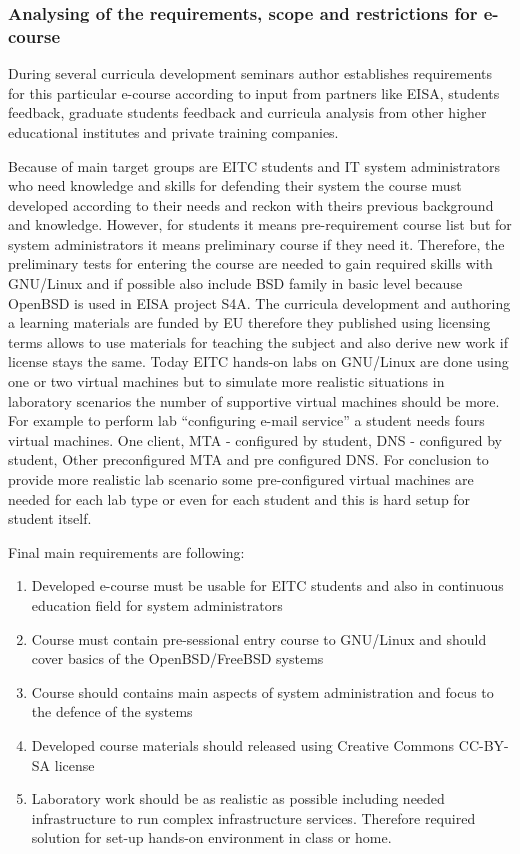 \subsubsection{Analysing of the requirements, scope and restrictions for e-course}
During several curricula development seminars author establishes requirements for this particular e-course according to input from partners like \gls{EISA}, students feedback, graduate students feedback and curricula analysis from other higher educational institutes and private training companies. 

Because of main target groups are \gls{EITC} students and IT system administrators who need knowledge and skills for defending their system the course must developed according to their needs and reckon with theirs previous background and knowledge. However, for students it means pre-requirement course list but for system administrators it means preliminary course if they need it. Therefore, the preliminary tests for entering the course are needed to gain required skills with GNU/Linux and if possible also include BSD family in basic level because OpenBSD is used in \gls{EISA} project S4A.
The curricula development and authoring a learning materials are funded by EU therefore they  published using licensing terms allows to use materials for teaching the subject and also derive new work if license stays the same.
Today EITC hands-on labs on GNU/Linux are done using one or two virtual machines but to simulate more realistic situations in laboratory scenarios the number of supportive virtual machines should be more. For example to perform lab “configuring e-mail service” a student needs fours virtual machines. One client, MTA - configured by student, DNS -  configured by student, Other preconfigured MTA and pre configured DNS. For conclusion to provide more realistic lab scenario some pre-configured virtual machines are needed for each lab type or even for each student and this is hard setup for student itself.

Final main requirements are following:
\begin{enumerate}[label=Requirement \arabic*.,leftmargin=*]
  \item Developed e-course must be usable for \gls{EITC} students and also in continuous education field for system administrators
  \item Course must contain pre-sessional entry course to GNU/Linux and should cover basics  of the OpenBSD/FreeBSD systems
  \item Course should contains main aspects of system administration and focus to the defence of the systems
  \item Developed course materials should released using Creative Commons \gls{CC-BY-SA} license
  \item Laboratory work should be as realistic as possible including needed infrastructure to run complex infrastructure services. Therefore required solution for set-up hands-on environment in class or home.
\end{enumerate}

